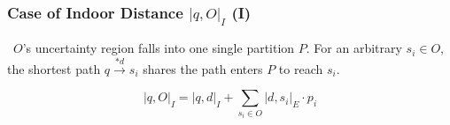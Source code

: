 
\begin{frame}
\frametitle{Case of Indoor Distance $|q, O|_I$ (I)}

~$O$'s uncertainty region falls into one single partition $P$. For an arbitrary $s_i \in O$, the shortest path $q \overset{*d}{\rightarrow} s_i$ shares the path enters $P$ to reach $s_i$.

\begin{equation}
  |q, O|_{I} = |q,d|_I + \sum_{s_i \in O}|d, s_i|_E \cdot p_i
\end{equation}

\end{frame}


